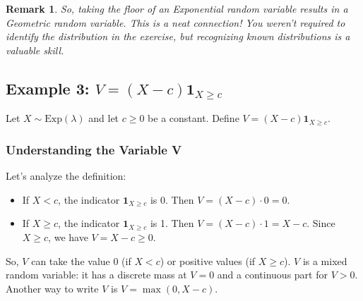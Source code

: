\documentclass[11pt]{article}
\theoremstyle{mytheoremstyle}
\theoremstyle{mydefinitionstyle}
\newtheorem{remark}[theorem]{Remark}
\newcommand{\indicator}[1]{\mathbf{1}_{#1}}
\begin{document}
\begin{remark}
So, taking the floor of an Exponential random variable results in a Geometric random variable. This is a neat connection! You weren't required to identify the distribution in the exercise, but recognizing known distributions is a valuable skill.
\end{remark}

\subsection{Example 3: $V = (X-c) \indicator{X \ge c}$}

Let $X \sim \text{Exp}(\lambda)$ and let $c \ge 0$ be a constant. Define $V = (X-c) \indicator{X \ge c}$.

\subsubsection{Understanding the Variable V}
Let's analyze the definition:
\begin{itemize}
    \item If $X < c$, the indicator $\indicator{X \ge c}$ is 0. Then $V = (X-c) \cdot 0 = 0$.
    \item If $X \ge c$, the indicator $\indicator{X \ge c}$ is 1. Then $V = (X-c) \cdot 1 = X-c$. Since $X \ge c$, we have $V = X-c \ge 0$.
\end{itemize}
So, $V$ can take the value 0 (if $X<c$) or positive values (if $X \ge c$).
$V$ is a mixed random variable: it has a discrete mass at $V=0$ and a continuous part for $V > 0$.
Another way to write $V$ is $V = \max(0, X-c)$.
\end{document}
